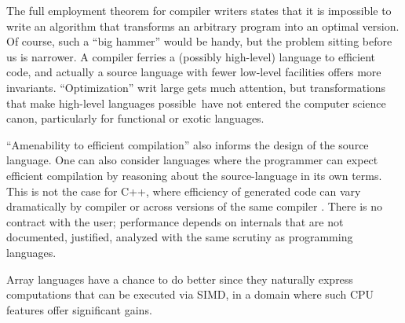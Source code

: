 \documentclass{article}
\begin{document}
The full employment theorem for compiler writers states that it is impossible to write an algorithm that transforms an arbitrary program into an optimal version. Of course, such a ``big hammer'' would be handy, but the problem sitting before us is narrower. A compiler ferries a (possibly high-level) language to efficient code, and actually a source language with fewer low-level facilities offers more invariants. ``Optimization'' writ large gets much attention, but transformations that make high-level languages possible\footnotemark~have not entered the computer science canon, particularly for functional or exotic languages.


``Amenability to efficient compilation'' also informs the design of the source language. One can also consider languages where the programmer can expect efficient compilation by reasoning about the source-language in its own terms. This is not the case for C++, where efficiency of generated code can vary dramatically by compiler or across versions of the same compiler \cite{intrinsics,kolodiej,cc}. There is no contract with the user; performance depends on internals that are not documented, justified, analyzed with the same scrutiny as programming languages.

Array languages have a chance to do better since they naturally express computations that can be executed via SIMD, in a domain where such CPU features offer significant gains.
\end{document}
